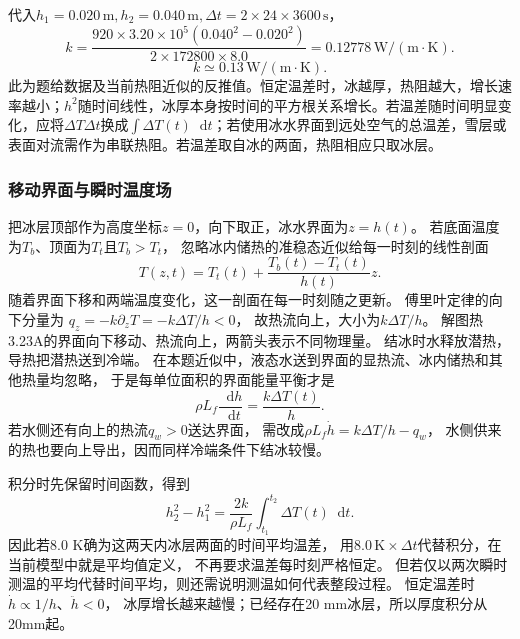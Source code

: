 \documentclass[UTF8,fontset=fandol,a4paper,11pt]{ctexart}
\newcommand{\dd}{\mathop{}\!\mathrm{d}}
\newcommand{\result}[1]{\begin{equation*}\boxed{#1}\end{equation*}}
\begin{document}
代入$h_1=0.020\,\mathrm m,h_2=0.040\,\mathrm m,\Delta t=2\times24\times3600\,\mathrm s$，
\[k=\frac{920\times3.20\times10^5(0.040^2-0.020^2)}{2\times172800\times8.0}
=0.12778\,\mathrm{W/(m\cdot K)}.\]
\result{k\simeq0.13\,\mathrm{W/(m\cdot K)}.}
此为题给数据及当前热阻近似的反推值。恒定温差时，冰越厚，热阻越大，增长速率越小；$h^2$随时间线性，冰厚本身按时间的平方根关系增长。若温差随时间明显变化，应将$\Delta T\Delta t$换成$\int\Delta T(t)\dd t$；若使用冰水界面到远处空气的总温差，雪层或表面对流需作为串联热阻。若温差取自冰的两面，热阻相应只取冰层。
\subsubsection*{移动界面与瞬时温度场}
把冰层顶部作为高度坐标$z=0$，向下取正，冰水界面为$z=h(t)$。
若底面温度为$T_b$、顶面为$T_t$且$T_b>T_t$，
忽略冰内储热的准稳态近似给每一时刻的线性剖面
\[
T(z,t)=T_t(t)+\frac{T_b(t)-T_t(t)}{h(t)}z.
\]
随着界面下移和两端温度变化，这一剖面在每一时刻随之更新。
傅里叶定律的向下分量为
$q_z=-k\partial_zT=-k\Delta T/h<0$，
故热流向上，大小为$k\Delta T/h$。
解图热3.23A的界面向下移动、热流向上，两箭头表示不同物理量。
结冰时水释放潜热，导热把潜热送到冷端。
在本题近似中，液态水送到界面的显热流、冰内储热和其他热量均忽略，
于是每单位面积的界面能量平衡才是
\[
\rho L_f\frac{\dd h}{\dd t}=\frac{k\Delta T(t)}h.
\]
若水侧还有向上的热流$q_w>0$送达界面，
需改成$\rho L_f\dot h=k\Delta T/h-q_w$，
水侧供来的热也要向上导出，因而同样冷端条件下结冰较慢。

积分时先保留时间函数，得到
\[
h_2^2-h_1^2=\frac{2k}{\rho L_f}
\int_{t_1}^{t_2}\Delta T(t)\dd t.
\]
因此若8.0 K确为这两天内冰层两面的时间平均温差，
用$8.0\,\mathrm K\times\Delta t$代替积分，在当前模型中就是平均值定义，
不再要求温差每时刻严格恒定。
但若仅以两次瞬时测温的平均代替时间平均，则还需说明测温如何代表整段过程。
恒定温差时$\dot h\propto1/h$、$\ddot h<0$，
冰厚增长越来越慢；已经存在20 mm冰层，所以厚度积分从20mm起。
\end{document}
